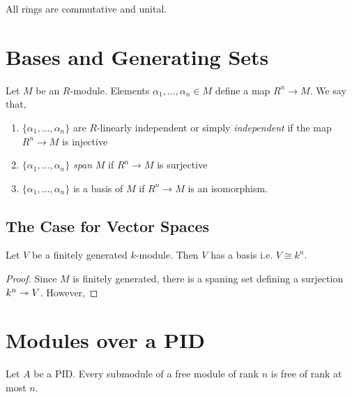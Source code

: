 \documentclass[12pt]{article}
\begin{document}
\begin{rmk}
All rings are commutative and unital.
\end{rmk}


\section{Bases and Generating Sets}

\begin{defn}
Let $M$ be an $R$-module. Elements $\alpha_1, \dots, \alpha_n \in M$ define a map $R^n \to M$. We say that,
\begin{enumerate}
\item $\{ \alpha_1, \dots, \alpha_n \}$ are $R$-linearly independent or simply \textit{independent} if the map $R^n \to M$ is injective
\item $\{ \alpha_1, \dots, \alpha_n \}$ \textit{span} $M$ if $R^n \to M$ is surjective
\item $\{ \alpha_1, \dots, \alpha_n \}$ is a basis of $M$ if $R^n \to M$ is an isomorphism. 
\end{enumerate}
\end{defn}

\subsection{The Case for Vector Spaces}

\begin{lemma}
Let $V$ be a finitely generated $k$-module. Then $V$ has a basis i.e. $V \cong k^n$.
\end{lemma}

\begin{proof}
Since $M$ is finitely generated, there is a spaning set defining a surjection $k^n \twoheadrightarrow V$. However, 
\end{proof}


\section{Modules over a PID}

\begin{thm}
Let $A$ be a PID. Every submodule of a free module of rank $n$ is free of rank at most $n$.
\end{thm}
\end{document}
